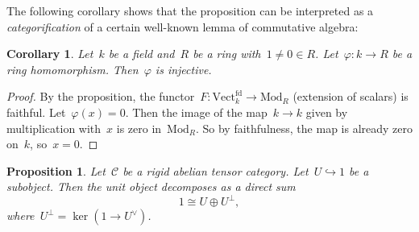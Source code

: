 \documentclass[a4paper,english,12pt]{scrartcl}
\theoremstyle{definition}
\theoremstyle{plain}
\newtheorem{prop}[defn]{Proposition}
\newtheorem{cor}[defn]{Corollary}
\theoremstyle{remark}
\newcommand{\C}{\mathcal{C}}
\renewcommand{\_}{\mathpunct{.}\,}
\newcommand{\?}{\,{:}\,}
\newcommand{\Mod}{\mathrm{Mod}}
\newcommand{\Vect}{\mathrm{Vect}}
\begin{document}
The following corollary shows that the proposition can be interpreted as a
\emph{categorification} of a certain well-known lemma of commutative algebra:

\begin{cor}Let~$k$ be a field and~$R$ be a ring with~$1 \neq 0 \in R$.
Let~$\varphi : k \to R$ be a ring homomorphism. Then~$\varphi$ is
injective.\end{cor}
\begin{proof}By the proposition, the functor~$F : \Vect_k^\mathrm{fd} \to
\Mod_R$ (extension of scalars) is faithful. Let~$\varphi(x) = 0$. Then the
image of the map~$k \to k$ given by multiplication with~$x$ is zero in~$\Mod_R$. So by
faithfulness, the map is already zero on~$k$, so~$x = 0$.\end{proof}

\begin{prop}Let~$\C$ be a rigid abelian tensor category. Let~$U \hookrightarrow
1$ be a subobject. Then the unit object decomposes as a direct sum
\[ 1 \cong U \oplus U^\perp, \]
where~$U^\perp = \ker(1 \to U^\vee)$.\end{prop}
\end{document}
